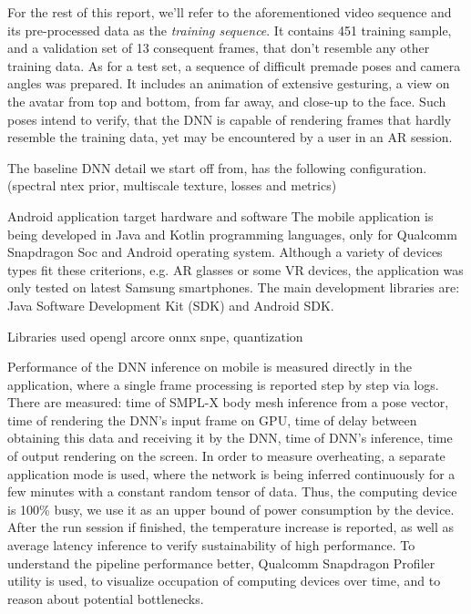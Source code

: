 For the rest of this report, we'll refer to the aforementioned video sequence and its pre-processed data as the \textit{training sequence}. It contains \alert{451} training sample, and a validation set of 13 consequent frames, that don't resemble any other training data. As for a test set, a sequence of difficult premade poses and camera angles was prepared. It includes an animation of extensive gesturing, a view on the avatar from top and bottom, from far away, and close-up to the face. Such poses intend to verify, that the DNN is capable of rendering frames that hardly resemble the training data, yet may be encountered by a user in an AR session.

The baseline DNN \cite{dnn:stylepeople21} detail we start off from, has the following configuration. (spectral ntex prior, multiscale texture, losses and metrics)

Android application target hardware and software
The mobile application is being developed in Java and Kotlin programming languages, only for Qualcomm Snapdragon Soc and Android operating system. Although a variety of devices types fit these criterions, e.g. AR glasses or some VR devices, the application was only tested on latest Samsung smartphones. The main development libraries are: Java Software Development Kit (SDK) and Android SDK.

Libraries used opengl arcore onnx snpe, quantization

Performance of the DNN inference on mobile is measured directly in the application, where a single frame processing is reported step by step via logs. There are measured: time of SMPL-X body mesh inference from a pose vector, time of rendering the DNN's input frame on GPU, time of delay between obtaining this data and receiving it by the DNN, time of DNN's inference, time of output rendering on the screen. In order to measure overheating, a separate application mode is used, where the network is being inferred continuously for a few minutes with a constant random tensor of data. Thus, the computing device is 100\% busy, we use it as an upper bound of power consumption by the device. After the run session if finished, the temperature increase is reported, as well as average latency inference to verify sustainability of high performance. To understand the pipeline performance better, Qualcomm Snapdragon Profiler utility is used, to visualize occupation of computing devices over time, and to reason about potential bottlenecks.

